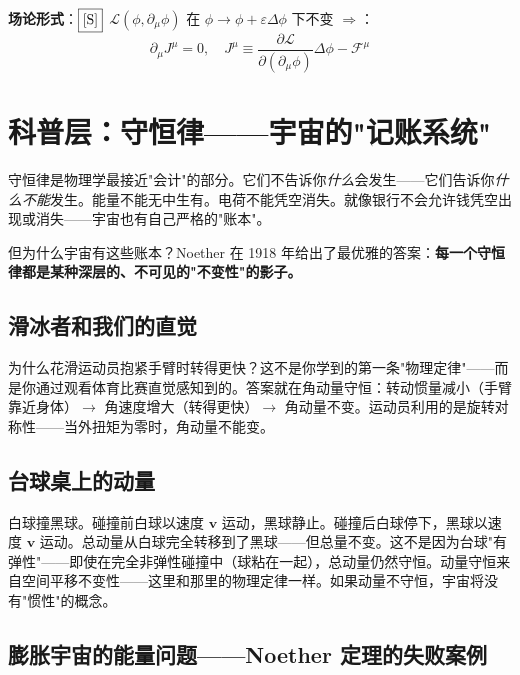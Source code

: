 \textbf{场论形式}：$\fbox{[S]}$ $\mathcal{L}(\phi,\partial_\mu\phi)$ 在 $\phi \to \phi + \varepsilon\Delta\phi$ 下不变 $\Rightarrow$：
\begin{equation}
\partial_\mu J^\mu = 0, \quad J^\mu \equiv \frac{\partial\mathcal{L}}{\partial(\partial_\mu\phi)}\Delta\phi - \mathcal{F}^\mu
\end{equation}


\section{科普层：守恒律——宇宙的"记账系统"}

守恒律是物理学最接近"会计"的部分。它们不告诉你\textit{什么}会发生——它们告诉你\textit{什么不能}发生。能量不能无中生有。电荷不能凭空消失。就像银行不会允许钱凭空出现或消失——宇宙也有自己严格的"账本"。

但为什么宇宙有这些账本？Noether 在 1918 年给出了最优雅的答案：\textbf{每一个守恒律都是某种深层的、不可见的"不变性"的影子。}

\subsection{滑冰者和我们的直觉}

为什么花滑运动员抱紧手臂时转得更快？这不是你学到的第一条"物理定律"——而是你通过观看体育比赛直觉感知到的。答案就在角动量守恒：转动惯量减小（手臂靠近身体）$\to$ 角速度增大（转得更快）$\to$ 角动量不变。运动员利用的是旋转对称性——当外扭矩为零时，角动量不能变。

\subsection{台球桌上的动量}

白球撞黑球。碰撞前白球以速度 $\mathbf{v}$ 运动，黑球静止。碰撞后白球停下，黑球以速度 $\mathbf{v}$ 运动。总动量从白球完全转移到了黑球——但总量不变。这不是因为台球"有弹性"——即使在完全非弹性碰撞中（球粘在一起），总动量仍然守恒。动量守恒来自空间平移不变性——这里和那里的物理定律一样。如果动量不守恒，宇宙将没有"惯性"的概念。

\subsection{膨胀宇宙的能量问题——Noether 定理的失败案例}

